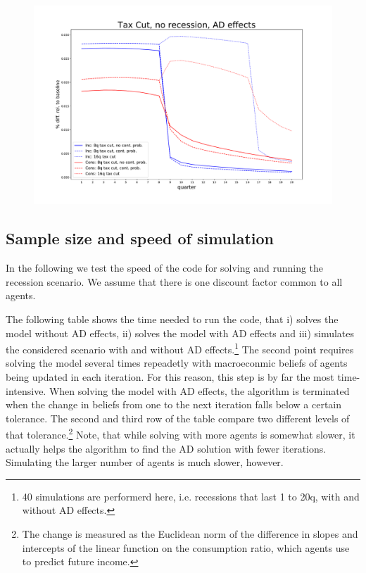 \documentclass[]{article}
\begin{document}
\begin{figure}
	\centering
	\includegraphics[width=\linewidth]{../Continuation_Prob_0/tax_cut_no_recession_AD_effects}
	\caption{}
	\label{fig:taxcutnorecessionadeffects}
\end{figure}



\FloatBarrier
\subsection{Sample size and speed of simulation}

In the following we test the speed of the code for solving and running the recession scenario. We assume that there is one discount factor common to all agents.

The following table shows the time needed to run the code, that i) solves the model without AD effects, ii) solves the model with AD effects and iii) simulates the considered scenario with and without AD effects.\footnote{40 simulations are performerd here, i.e. recessions that last 1 to 20q, with and without AD effects.} The second point requires solving the model several times repeadetly with macroeconmic beliefs of agents being updated in each iteration. For this reason, this step is by far the most time-intensive. When solving the model with AD effects, the algorithm is terminated when the change in beliefs from one to the next iteration falls below a certain tolerance. The second and third row of the table compare two different levels of that tolerance.\footnote{The change is measured as the Euclidean norm of the difference in slopes and intercepts of the linear function on the consumption ratio, which agents use to predict future income.} Note, that while solving with more agents is somewhat slower, it actually helps the algorithm to find the AD solution with fewer iterations. Simulating the larger number of agents is much slower, however.
\end{document}

